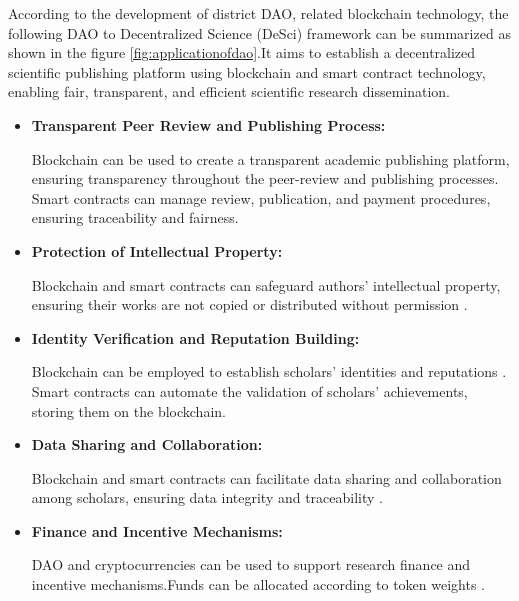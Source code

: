 \documentclass[lettersize,journal]{IEEEtran}
\begin{document}
According to the development of district DAO, related blockchain technology, the following DAO to Decentralized Science (DeSci) framework can be summarized as shown in the figure \ref{fig:applicationofdao}.It aims to establish a decentralized scientific publishing platform using blockchain and smart contract technology, enabling fair, transparent, and efficient scientific research dissemination.

\begin{itemize}
  \item \textbf{Transparent Peer Review and Publishing Process:}

        Blockchain can be used to create a transparent academic publishing platform, ensuring transparency throughout the peer-review and publishing processes.\cite{nakamoto2008bitcoin} Smart contracts can manage review, publication, and payment procedures, ensuring traceability and fairness.

  \item \textbf{Protection of Intellectual Property:}

        Blockchain and smart contracts can safeguard authors' intellectual property, ensuring their works are not copied or distributed without permission \cite{gurkaynak2018intellectual}.

  \item \textbf{Identity Verification and Reputation Building:}

        Blockchain can be employed to establish scholars' identities and reputations \cite{radziwill2018blockchain}. Smart contracts can automate the validation of scholars' achievements, storing them on the blockchain.

  \item \textbf{Data Sharing and Collaboration:}

        Blockchain and smart contracts can facilitate data sharing and collaboration among scholars, ensuring data integrity and traceability \cite{praitheeshan2019security}.

  \item \textbf{Finance and Incentive Mechanisms:}

        DAO and cryptocurrencies can be used to support research finance and incentive mechanisms.Funds can be allocated according to token weights \cite{schar2021decentralized}.
\end{itemize}
\end{document}
